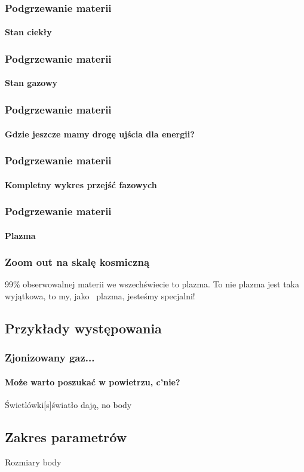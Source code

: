 \documentclass{beamer}
\begin{document}
  \begin{frame}
    \frametitle{Podgrzewanie materii}
    \framesubtitle{Stan ciekły}
  \end{frame}


  \begin{frame}
    \frametitle{Podgrzewanie materii}
    \framesubtitle{Stan gazowy}
    \pause
  \end{frame}


  \begin{frame}
    \frametitle{Podgrzewanie materii}
    \framesubtitle{Gdzie jeszcze mamy drogę ujścia dla energii?}
  \end{frame}


  \begin{frame}
    \frametitle{Podgrzewanie materii}
    \framesubtitle{Kompletny wykres przejść fazowych}
  \end{frame}


  \begin{frame}
    \frametitle{Podgrzewanie materii}
    \framesubtitle{Plazma}
    \pause
  \end{frame}


  \begin{frame}
    \frametitle{Zoom out na skalę kosmiczną}
    99\% obserwowalnej materii we wszechświecie to plazma.
    \pause
    \pause
    To nie plazma jest taka wyjątkowa, to my, jako ~plazma, jesteśmy specjalni!
  \end{frame}

\subsection{Przykłady występowania}

\begin{frame}
  \frametitle{Zjonizowany gaz...}
  \framesubtitle{Może warto poszukać w powietrzu, c'nie?}
\end{frame}

\begin{frame}[t]{Świetlówki}[s]{światło dają, no}
  body
\end{frame}

\subsection{Zakres parametrów}
\begin{frame}[t]{Rozmiary}
  body
\end{frame}
\end{document}
